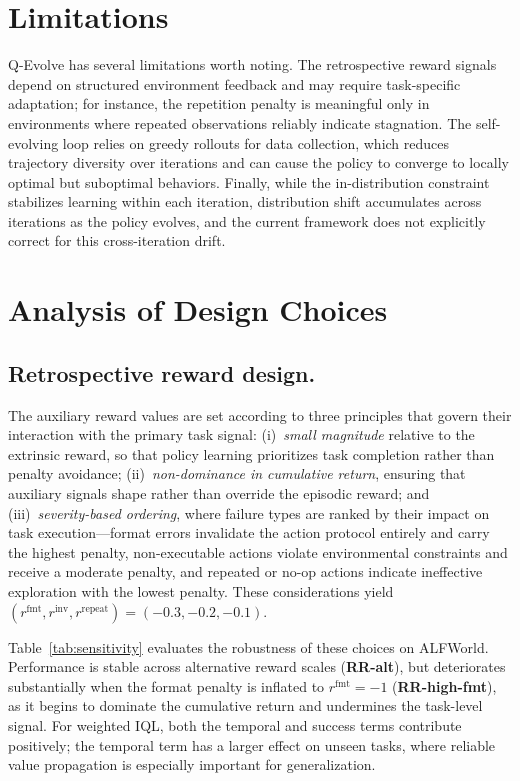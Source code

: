 \newpage
\appendix

\section*{Limitations}
Q-Evolve has several limitations worth noting. The retrospective reward signals depend on structured environment feedback and may require task-specific adaptation; for instance, the repetition penalty is meaningful only in environments where repeated observations reliably indicate stagnation. The self-evolving loop relies on greedy rollouts for data collection, which reduces trajectory diversity over iterations and can cause the policy to converge to locally optimal but suboptimal behaviors. Finally, while the in-distribution constraint stabilizes learning within each iteration, distribution shift accumulates across iterations as the policy evolves, and the current framework does not explicitly correct for this cross-iteration drift.




\section{Analysis of Design Choices}

\subsection{Retrospective reward design.}
The auxiliary reward values are set according to three principles that govern their interaction with the primary task signal: (i)~\emph{small magnitude} relative to the extrinsic reward, so that policy learning prioritizes task completion rather than penalty avoidance; (ii)~\emph{non-dominance in cumulative return}, ensuring that auxiliary signals shape rather than override the episodic reward; and (iii)~\emph{severity-based ordering}, where failure types are ranked by their impact on task execution---format errors invalidate the action protocol entirely and carry the highest penalty, non-executable actions violate environmental constraints and receive a moderate penalty, and repeated or no-op actions indicate ineffective exploration with the lowest penalty.
These considerations yield $(r^{\text{fmt}}, r^{\text{inv}}, r^{\text{repeat}}) = (-0.3, -0.2, -0.1)$.

Table~\ref{tab:sensitivity} evaluates the robustness of these choices on ALFWorld.
Performance is stable across alternative reward scales (\textbf{RR-alt}), but deteriorates substantially when the format penalty is inflated to $r^{\text{fmt}}=-1$ (\textbf{RR-high-fmt}), as it begins to dominate the cumulative return and undermines the task-level signal.
For weighted IQL, both the temporal and success terms contribute positively; the temporal term has a larger effect on unseen tasks, where reliable value propagation is especially important for generalization.



